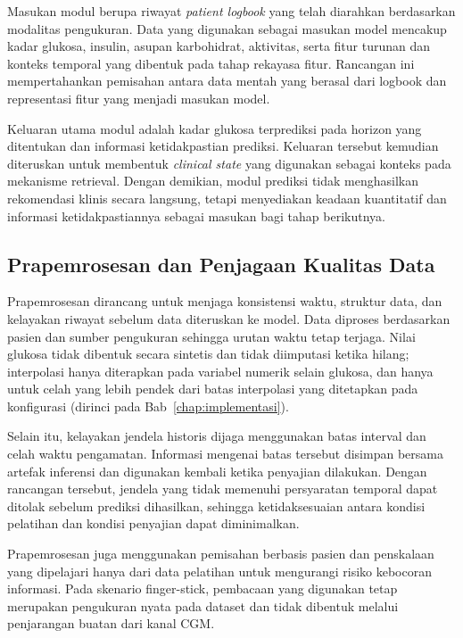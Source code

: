 Masukan modul berupa riwayat \textit{patient logbook} yang telah diarahkan berdasarkan modalitas pengukuran. Data yang digunakan sebagai masukan model mencakup kadar glukosa, insulin,
asupan karbohidrat, aktivitas, serta fitur turunan dan konteks temporal yang dibentuk pada tahap rekayasa fitur. Rancangan ini mempertahankan pemisahan antara data mentah yang berasal
dari logbook dan representasi fitur yang menjadi masukan model.

Keluaran utama modul adalah kadar glukosa terprediksi pada horizon yang ditentukan dan informasi ketidakpastian prediksi. Keluaran tersebut kemudian diteruskan untuk membentuk
\textit{clinical state} yang digunakan sebagai konteks pada mekanisme retrieval. Dengan demikian, modul prediksi tidak menghasilkan rekomendasi klinis secara langsung, tetapi
menyediakan keadaan kuantitatif dan informasi ketidakpastiannya sebagai masukan bagi tahap berikutnya.

\subsection{Prapemrosesan dan Penjagaan Kualitas Data} 
\label{subsec:bab4-prapemrosesan-kualitas-data}

Prapemrosesan dirancang untuk menjaga konsistensi waktu, struktur data, dan kelayakan riwayat sebelum data diteruskan ke model. Data diproses berdasarkan pasien dan sumber pengukuran
sehingga urutan waktu tetap terjaga. Nilai glukosa tidak dibentuk secara sintetis dan tidak diimputasi ketika hilang; interpolasi hanya diterapkan pada variabel numerik
selain glukosa, dan hanya untuk celah yang lebih pendek dari batas interpolasi yang ditetapkan pada konfigurasi (dirinci pada Bab~\ref{chap:implementasi}).

Selain itu, kelayakan jendela historis dijaga menggunakan batas interval dan celah waktu pengamatan. Informasi mengenai batas tersebut disimpan bersama artefak inferensi dan digunakan
kembali ketika penyajian dilakukan. Dengan rancangan tersebut, jendela yang tidak memenuhi persyaratan temporal dapat ditolak sebelum prediksi dihasilkan, sehingga ketidaksesuaian
antara kondisi pelatihan dan kondisi penyajian dapat diminimalkan.

Prapemrosesan juga menggunakan pemisahan berbasis pasien dan penskalaan yang dipelajari hanya dari data pelatihan untuk mengurangi risiko kebocoran informasi. Pada skenario
finger-stick, pembacaan yang digunakan tetap merupakan pengukuran nyata pada dataset dan tidak dibentuk melalui penjarangan buatan dari kanal CGM.

